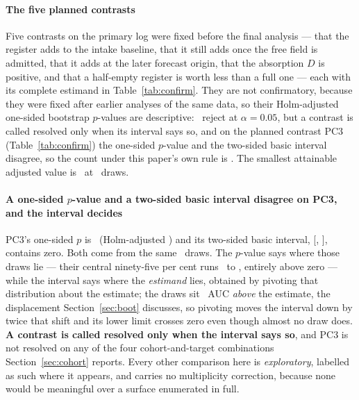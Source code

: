 
\label{sec:planned}
\paragraph{The five planned contrasts}
Five contrasts on the primary log were fixed before the final analysis ---
that the register adds to the intake baseline, that it still adds once the
free field is admitted, that it adds at the later forecast origin, that the
absorption $D$ is positive, and that a half-empty register is worth less than
a full one --- each with its complete estimand in Table~\ref{tab:confirm}.
They are not confirmatory, because they were fixed after earlier analyses of
the same data, so their Holm-adjusted one-sided bootstrap $p$-values
\citep{holm1979simple} are descriptive: \nPlannedReject\ reject at $\alpha = 0.05$, but
a contrast is called resolved only when its interval says so, and on
the planned contrast \textsf{PC3} (Table~\ref{tab:confirm}) the one-sided
$p$-value and the two-sided basic interval
disagree, so the count under this paper's own rule is \nPlannedResolved.
The smallest attainable adjusted value is \pMinAttainableHolm\ at
\nDrawsPlanned\ draws.

\paragraph{A one-sided $p$-value and a two-sided basic interval disagree on
\textsf{PC3}, and the interval decides}
\textsf{PC3}'s one-sided $p$ is \pcThreePraw\ (Holm-adjusted
\pcThreePholm) and its two-sided basic interval, [\pcThreeLo, \pcThreeHi],
contains zero. Both come from the same \nDrawsPcThree\ draws. The $p$-value
says where those draws lie --- their central ninety-five per cent runs
\pcThreeQlo\ to \pcThreeQhi, entirely above zero --- while the interval says
where the \emph{estimand} lies, obtained by pivoting that distribution about
the estimate; the draws sit \pcThreeShift\ AUC \emph{above} the estimate, the
displacement Section~\ref{sec:boot} discusses, so pivoting moves the interval
down by twice that shift and its lower limit crosses zero even though almost
no draw does. \textbf{A contrast is called resolved only when the interval
says so}, and \textsf{PC3} is not resolved on any of the four
cohort-and-target combinations Section~\ref{sec:cohort} reports. Every other
comparison here is \emph{exploratory}, labelled as such where it appears, and
carries no multiplicity correction, because none would be meaningful over a
surface enumerated in full.

